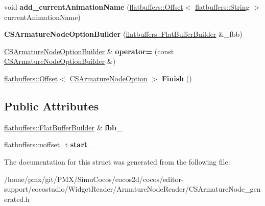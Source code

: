 \begin{DoxyCompactItemize}
void {\bfseries add\+\_\+current\+Animation\+Name} (\hyperlink{structflatbuffers_1_1Offset}{flatbuffers\+::\+Offset}$<$ \hyperlink{structflatbuffers_1_1String}{flatbuffers\+::\+String} $>$ current\+Animation\+Name)
\item 
\mbox{\label{structflatbuffers_1_1CSArmatureNodeOptionBuilder_a1c7129d2801a3affada110106aaef876}} 
{\bfseries C\+S\+Armature\+Node\+Option\+Builder} (\hyperlink{classflatbuffers_1_1FlatBufferBuilder}{flatbuffers\+::\+Flat\+Buffer\+Builder} \&\+\_\+fbb)
\item 
\mbox{\label{structflatbuffers_1_1CSArmatureNodeOptionBuilder_a762060b7f9533c0c897c509c9fd1973f}} 
\hyperlink{structflatbuffers_1_1CSArmatureNodeOptionBuilder}{C\+S\+Armature\+Node\+Option\+Builder} \& {\bfseries operator=} (const \hyperlink{structflatbuffers_1_1CSArmatureNodeOptionBuilder}{C\+S\+Armature\+Node\+Option\+Builder} \&)
\item 
\mbox{\label{structflatbuffers_1_1CSArmatureNodeOptionBuilder_a20ca9a01ab02d3b79dcaeef3d1d4b2eb}} 
\hyperlink{structflatbuffers_1_1Offset}{flatbuffers\+::\+Offset}$<$ \hyperlink{structflatbuffers_1_1CSArmatureNodeOption}{C\+S\+Armature\+Node\+Option} $>$ {\bfseries Finish} ()
\end{DoxyCompactItemize}
\subsection*{Public Attributes}
\begin{DoxyCompactItemize}
\item 
\mbox{\label{structflatbuffers_1_1CSArmatureNodeOptionBuilder_a4bada1cef36f8a7866cc2548af4a99c8}} 
\hyperlink{classflatbuffers_1_1FlatBufferBuilder}{flatbuffers\+::\+Flat\+Buffer\+Builder} \& {\bfseries fbb\+\_\+}
\item 
\mbox{\label{structflatbuffers_1_1CSArmatureNodeOptionBuilder_a31f20c5acffb61fc99cfb2a7d5437b80}} 
flatbuffers\+::uoffset\+\_\+t {\bfseries start\+\_\+}
\end{DoxyCompactItemize}


The documentation for this struct was generated from the following file\+:\begin{DoxyCompactItemize}
\item 
/home/pmx/git/\+P\+M\+X/\+Simu\+Cocos/cocos2d/cocos/editor-\/support/cocostudio/\+Widget\+Reader/\+Armature\+Node\+Reader/C\+S\+Armature\+Node\+\_\+generated.\+h\end{DoxyCompactItemize}
